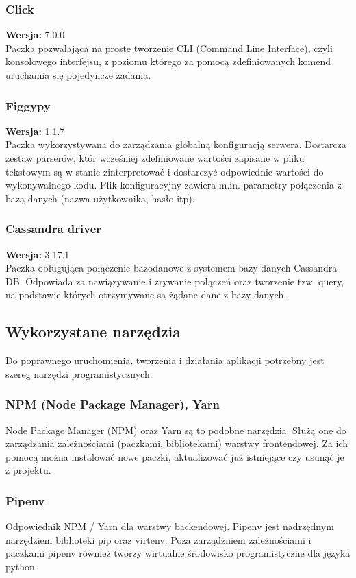 \documentclass[eng,printmode]{mgr}
\begin{document}
\subsubsection{Click}
\small \textbf{Wersja:} 7.0.0\\
Paczka pozwalająca na proste tworzenie CLI (Command Line Interface), czyli konsolowego interfejsu, z poziomu którego za pomocą zdefiniowanych komend uruchamia się pojedyncze zadania.
\subsubsection{Figgypy}
\small \textbf{Wersja:} 1.1.7\\
Paczka wykorzystywana do zarządzania globalną konfiguracją serwera. Dostarcza zestaw parserów, któr wcześniej zdefiniowane wartości zapisane w pliku tekstowym są w stanie zinterpretować i dostarczyć odpowiednie wartości do wykonywalnego kodu. Plik konfiguracyjny zawiera m.in. parametry połączenia z bazą danych (nazwa użytkownika, hasło itp).
\subsubsection{Cassandra driver}
\small \textbf{Wersja:} 3.17.1\\
Paczka obługująca połączenie bazodanowe z systemem bazy danych Cassandra DB. Odpowiada za nawiązywanie i zrywanie połączeń oraz tworzenie tzw. query, na podstawie których otrzymywane są żądane dane z bazy danych.
\subsection{Wykorzystane narzędzia}
Do poprawnego uruchomienia, tworzenia i działania aplikacji potrzebny jest szereg narzędzi programistycznych.
\subsubsection{NPM (Node Package Manager), Yarn}
Node Package Manager (NPM) oraz Yarn są to podobne narzędzia. Służą one do zarządzania zależnościami (paczkami, bibliotekami) warstwy frontendowej. Za ich pomocą można instalować nowe paczki, aktualizować już istniejące czy usunąć je z projektu.
\subsubsection{Pipenv}
Odpowiednik NPM / Yarn dla warstwy backendowej. Pipenv jest nadrzędnym narzędziem biblioteki pip oraz virtenv. Poza zarządzniem zależnościami i paczkami pipenv również tworzy wirtualne środowisko programistyczne dla języka python.
\end{document}
